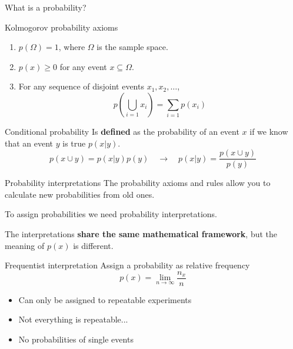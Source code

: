\documentclass[
aspectratio=169,
14pt,
professionalfonts
]{beamer}
\begin{document}
\begin{frame}
\centering
\Large
What is a probability?
\end{frame}

\begin{frame}{Kolmogorov probability axioms}
\begin{enumerate}
  \item $ p(\Omega) = 1 $, where \( \Omega \) is the sample space.
  \item $ p(x) \geq 0 $ for any event \( x \subseteq \Omega \).
  \item For any sequence of disjoint events \( x_1, x_2, \dots \),
        $$
        p\left( \bigcup_{i=1} x_i \right) = \sum_{i=1} p(x_i)
        $$
\end{enumerate}
\end{frame}


\begin{frame}{Conditional probability}
Is \textbf{defined} as the probability of an event $x$ if we know that an event $y$ is true $p(x|y)$.
$$p(x \cup y) = p(x|y)p(y) \quad \to \quad p(x|y) = \frac{p(x \cup y)}{p(y)}$$
\end{frame}

\begin{frame}{Probability interpretations}
    The probability axioms and rules allow you to calculate new probabilities from old ones.
    
    \vspace{0.5cm}
    To assign probabilities we need probability interpretations.

    \vspace{0.5cm}
    The interpretations \textbf{share the same mathematical framework}, but the meaning of $p(x)$ is different.
\end{frame}

\begin{frame}{Frequentist interpretation}
Assign a probability as relative frequency
$$
p(x) = \lim_{n\to\infty} \frac{n_x}{n}
$$

\begin{itemize}
    \item Can only be assigned to repeatable experiments
    \item Not everything is repeatable...
    \item No probabilities of single events
\end{itemize}
\end{frame}
\end{document}

